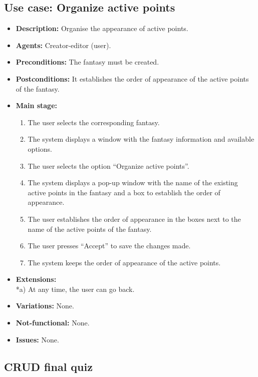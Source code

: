 \subsection{Use case: Organize active points}
\begin{itemize}
	\item \textbf{Description:} Organise the appearance of active points.
	\item \textbf{Agents:} Creator-editor (user).
	\item \textbf{Preconditions:} The fantasy must be created.
	\item \textbf{Postconditions:} It establishes the order of appearance of the active points of the fantasy.
	\item \textbf{Main stage:}
	\begin{enumerate}
		\item The user selects the corresponding fantasy.
		\item The system displays a window with the fantasy information and available options.
		\item The user selects the option ``Organize active points''.
		\item The system displays a pop-up window with the name of the existing active points in the fantasy and a box to establish the order of appearance.
		\item The user establishes the order of appearance in the boxes next to the name of the active points of the fantasy.
		\item The user presses ``Accept'' to save the changes made.
		\item The system keeps the order of appearance of the active points.
	\end{enumerate}
	\item \textbf{Extensions:} \\ *a) At any time, the user can go back.
	\item \textbf{Variations:} None.
	\item \textbf{Not-functional:} None.
	\item \textbf{Issues:} None.
\end{itemize}

\subsection{CRUD final quiz}
\hypertarget{crearquizfinal}{}
